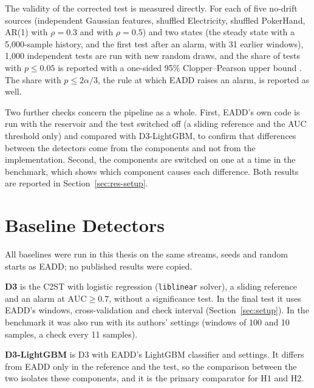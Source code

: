 The validity of the corrected test is measured directly. For each of five no-drift sources (independent Gaussian features, shuffled Electricity, shuffled PokerHand, AR(1) with $\rho = 0.3$ and with $\rho = 0.5$) and two states (the steady state with a 5,000-sample history, and the first test after an alarm, with 31 earlier windows), 1,000 independent tests are run with new random draws, and the share of tests with $p \leq 0.05$ is reported with a one-sided 95\% Clopper--Pearson upper bound \citep{ClopperPearson1934}. The share with $p \leq 2\alpha/3$, the rule at which EADD raises an alarm, is reported as well.

Two further checks concern the pipeline as a whole. First, EADD's own code is run with the reservoir and the test switched off (a sliding reference and the AUC threshold only) and compared with D3-LightGBM, to confirm that differences between the detectors come from the components and not from the implementation. Second, the components are switched on one at a time in the benchmark, which shows which component causes each difference. Both results are reported in Section~\ref{sec:res-setup}.

\section{Baseline Detectors}
\label{sec:baselines}
All baselines were run in this thesis on the same streams, seeds and random starts as EADD; no published results were copied.

\textbf{D3} \citep{Gozuacik2019} is the C2ST with logistic regression (\texttt{liblinear} solver), a sliding reference and an alarm at $\text{AUC} \geq 0.7$, without a significance test. In the final test it uses EADD's windows, cross-validation and check interval (Section~\ref{sec:setup}). In the benchmark it was also run with its authors' settings (windows of 100 and 10 samples, a check every 11 samples).

\textbf{D3-LightGBM} is D3 with EADD's LightGBM classifier and settings. It differs from EADD only in the reference and the test, so the comparison between the two isolates these components, and it is the primary comparator for H1 and H2.

